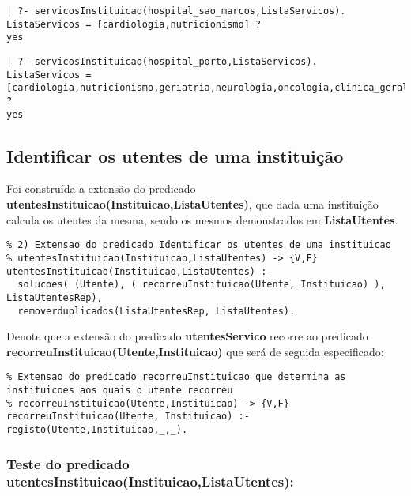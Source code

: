\documentclass[
  oneside,
  10pt, a4paper,
  footinclude=true,
  headinclude=true,
  cleardoublepage=empty
]{scrbook}
\begin{document}
\begin{lstlisting}
| ?- servicosInstituicao(hospital_sao_marcos,ListaServicos).
ListaServicos = [cardiologia,nutricionismo] ? 
yes
\end{lstlisting}

\begin{lstlisting}
| ?- servicosInstituicao(hospital_porto,ListaServicos).
ListaServicos = [cardiologia,nutricionismo,geriatria,neurologia,oncologia,clinica_geral] ? 
yes
\end{lstlisting}
















\subsection{Identificar os utentes de uma instituição}

Foi construída a extensão do predicado \textbf{utentesInstituicao(Instituicao,ListaUtentes)}, que dada uma instituição calcula os utentes da mesma, sendo os mesmos demonstrados em \textbf{ListaUtentes}.\par 
\begin{lstlisting}
% 2) Extensao do predicado Identificar os utentes de uma instituicao
% utentesInstituicao(Instituicao,ListaUtentes) -> {V,F}
utentesInstituicao(Instituicao,ListaUtentes) :-
  solucoes( (Utente), ( recorreuInstituicao(Utente, Instituicao) ), ListaUtentesRep),
  removerduplicados(ListaUtentesRep, ListaUtentes).
\end{lstlisting}


Denote que a extensão do predicado \textbf{utentesServico} recorre ao predicado  \textbf{recorreuInstituicao(Utente,Instituicao)} que será de seguida especificado:
\begin{lstlisting}
% Extensao do predicado recorreuInstituicao que determina as instituicoes aos quais o utente recorreu
% recorreuInstituicao(Utente,Instituicao) -> {V,F}
recorreuInstituicao(Utente, Instituicao) :- registo(Utente,Instituicao,_,_).
\end{lstlisting}

\subsubsection{Teste do predicado \textbf{utentesInstituicao(Instituicao,ListaUtentes)}:}
\end{document}
